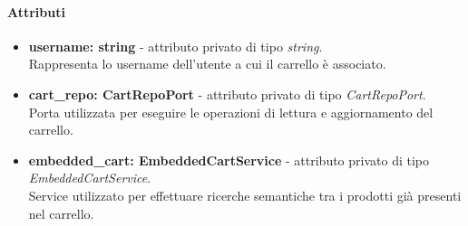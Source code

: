 \paragraph{Attributi}
\begin{itemize}
	\item \textbf{username: string} - attributo privato di tipo \textit{string}.\\
	Rappresenta lo username dell'utente a cui il carrello \`e associato.
	\item \textbf{cart\_repo: CartRepoPort} - attributo privato di tipo \textit{CartRepoPort}.\\
	Porta utilizzata per eseguire le operazioni di lettura e aggiornamento del carrello.
	\item \textbf{embedded\_cart: EmbeddedCartService} - attributo privato di tipo \textit{EmbeddedCartService}.\\
	Service utilizzato per effettuare ricerche semantiche tra i prodotti gi\`a presenti nel carrello.
\end{itemize}

